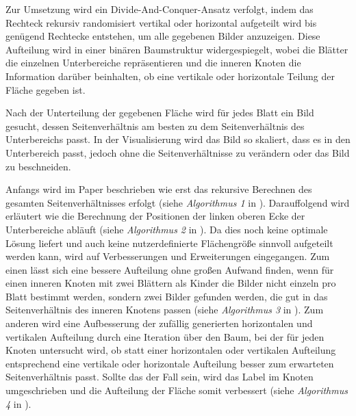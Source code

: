 \documentclass[12pt, ngerman, utf8]{article}
\begin{document}
Zur Umsetzung wird ein Divide-And-Conquer-Ansatz verfolgt, indem das Rechteck rekursiv randomisiert vertikal oder horizontal aufgeteilt wird bis genügend Rechtecke entstehen, um alle gegebenen Bilder anzuzeigen. Diese Aufteilung wird in einer binären Baumstruktur widergespiegelt, wobei die Blätter die einzelnen Unterbereiche repräsentieren und die inneren Knoten die Information darüber beinhalten, ob eine vertikale oder horizontale Teilung der Fläche gegeben ist.

Nach der Unterteilung der gegebenen Fläche wird für jedes Blatt ein Bild gesucht, dessen Seitenverhältnis am besten zu dem Seitenverhältnis des Unterbereichs passt. In der Visualisierung wird das Bild so skaliert, dass es in den Unterbereich passt, jedoch ohne die Seitenverhältnisse zu verändern oder das Bild zu beschneiden.

Anfangs wird im Paper beschrieben wie erst das rekursive Berechnen des gesamten Seitenverhältnisses erfolgt (siehe \emph{Algorithmus 1} in \cite{picwall}). Darauffolgend wird erläutert wie die Berechnung der Positionen der linken oberen Ecke der Unterbereiche abläuft (siehe \emph{Algorithmus 2} in \cite{picwall}). Da dies noch keine optimale Lösung liefert und auch keine nutzerdefinierte Flächengröße sinnvoll aufgeteilt werden kann, wird auf Verbesserungen und Erweiterungen eingegangen. Zum einen lässt sich eine bessere Aufteilung ohne großen Aufwand finden, wenn für einen inneren Knoten mit zwei Blättern als Kinder die Bilder nicht einzeln pro Blatt bestimmt werden, sondern zwei Bilder gefunden werden, die gut in das Seitenverhältnis des inneren Knotens passen (siehe \emph{Algorithmus 3} in \cite{picwall}). Zum anderen wird eine Aufbesserung der zufällig generierten horizontalen und vertikalen Aufteilung durch eine Iteration über den Baum, bei der für jeden Knoten untersucht wird, ob statt einer horizontalen oder vertikalen Aufteilung entsprechend eine vertikale oder horizontale Aufteilung besser zum erwarteten Seitenverhältnis passt. Sollte das der Fall sein, wird das Label im Knoten umgeschrieben und die Aufteilung der Fläche somit verbessert (siehe \emph{Algorithmus 4} in \cite{picwall}).
\end{document}
